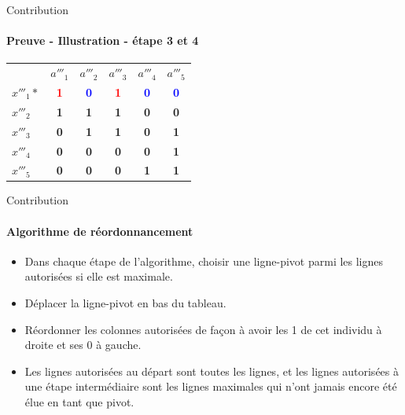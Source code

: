 \documentclass{beamer}
\begin{document}
 \begin{frame}{Contribution}
  \framesubtitle{Preuve - Illustration - étape 3 et 4}
\begin{table}[htb]
  \centering
\begin{tabular}{lccccc}
 & $a'''_1$ & $a'''_2$ & $a'''_3$ & $a'''_4$ & $a'''_5$\\
$x'''_1*$ & \textcolor{red}{\textbf{1}} & \textcolor{blue}{\textbf{0}} & \textcolor{red}{\textbf{1}} & \textcolor{blue}{\textbf{0}} & \textcolor{blue}{\textbf{0}}\\
$x'''_2$ & \textbf{1} & \textbf{1} & \textbf{1} & \textbf{0} & \textbf{0}\\
$x'''_3$ & \textbf{0} & \textbf{1} & \textbf{1} & \textbf{0} & \textbf{1}\\
$x'''_4$ & \textbf{0} & \textbf{0} & \textbf{0} & \textbf{0} & \textbf{1}\\
$x'''_5$ & \textbf{0} & \textbf{0} & \textbf{0} & \textbf{1} & \textbf{1}

\end{tabular}
\end{table}
  \end{frame}

 \begin{frame}{Contribution}
  \framesubtitle{Algorithme de réordonnancement}
\begin{itemize}

 \item Dans chaque étape de l'algorithme, choisir une ligne-pivot parmi les lignes autorisées si elle est maximale.
 \item Déplacer la ligne-pivot en bas du tableau. 
 \item Réordonner les colonnes autorisées de façon à avoir les 1 de cet individu à droite et ses 0 à gauche.
 \item Les lignes autorisées au départ sont toutes les lignes, et les lignes autorisées à une étape intermédiaire sont les lignes maximales qui n'ont jamais encore été élue
 en tant que pivot.
\end{itemize}

  \end{frame}
\end{document}
